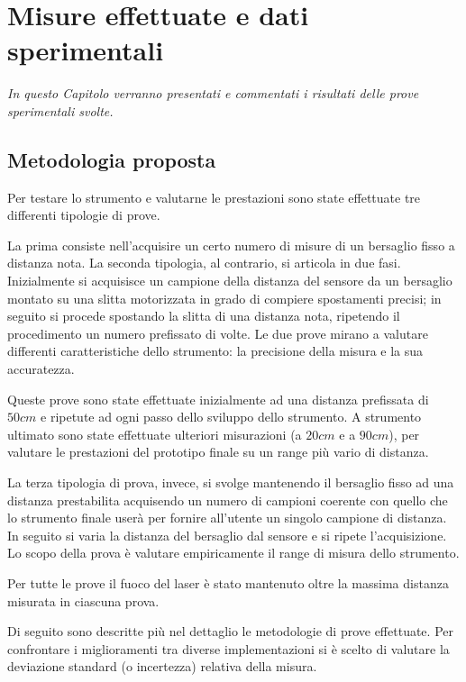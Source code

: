 \chapter{Misure effettuate e dati sperimentali}
\label{capitolo5}
\thispagestyle{empty}

\textit{In questo Capitolo verranno presentati e commentati i risultati delle prove sperimentali svolte.}

\section{Metodologia proposta}
Per testare lo strumento e valutarne le prestazioni sono state effettuate tre differenti tipologie di prove.

La prima consiste nell'acquisire un certo numero di misure di un bersaglio fisso a distanza nota. La seconda tipologia, al contrario, si articola in due fasi. Inizialmente si acquisisce un campione della distanza del sensore da un bersaglio montato su una slitta motorizzata in grado di compiere spostamenti precisi; in seguito si procede spostando la slitta di una distanza nota, ripetendo il procedimento un numero prefissato di volte. Le due prove mirano a valutare differenti caratteristiche dello strumento: la precisione della misura e la sua accuratezza.

Queste prove sono state effettuate inizialmente ad una distanza prefissata di $50cm$ e ripetute ad ogni passo dello sviluppo dello strumento. A strumento ultimato sono state effettuate ulteriori misurazioni (a $20cm$ e a $90cm$), per valutare le prestazioni del prototipo finale su un range più vario di distanza.

La terza tipologia di prova, invece, si svolge mantenendo il bersaglio fisso ad una distanza prestabilita acquisendo un numero di campioni coerente con quello che lo strumento finale userà per fornire all'utente un singolo campione di distanza. In seguito si varia la distanza del bersaglio dal sensore e si ripete l'acquisizione. Lo scopo della prova è valutare empiricamente il range di misura dello strumento.

Per tutte le prove il fuoco del laser è stato mantenuto oltre la massima distanza misurata in ciascuna prova.

Di seguito sono descritte più nel dettaglio le metodologie di prove effettuate. Per confrontare i miglioramenti tra diverse implementazioni si è scelto di valutare la deviazione standard  (o incertezza) relativa della misura.

